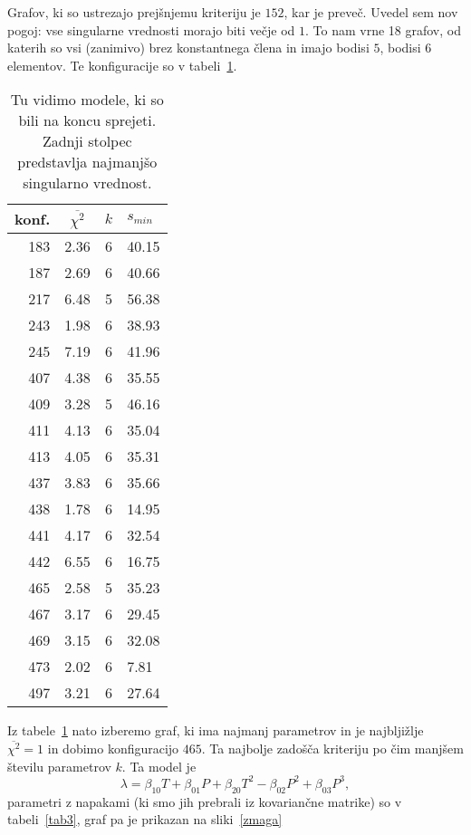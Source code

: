 \documentclass[a4 paper, 12pt]{article}
\begin{document}
Grafov, ki so ustrezajo prej\v snjemu kriteriju je $152$, kar je preve\v c. Uvedel sem nov pogoj: vse singularne
vrednosti morajo biti ve\v cje od $1$. To nam vrne 18 grafov, od katerih so vsi (zanimivo) brez konstantnega \v clena
in imajo bodisi $5$, bodisi $6$ elementov. Te konfiguracije so v tabeli~\ref{tab2}.
\begin{table}[H]\centering
	\caption{Tu vidimo modele, ki so bili na koncu sprejeti. Zadnji stolpec predstavlja najmanj\v so singularno
		vrednost.}
	\begin{tabular}{r|c|c|l}
		konf. & $\overline{\chi^2}$ & $k$ & $s_{min}$ \\
		\hline\hline
		183 & 2.36 & 6 & 40.15 \\
		187 & 2.69 & 6 & 40.66 \\
		217 & 6.48 & 5 & 56.38 \\
		243 & 1.98 & 6 & 38.93 \\
		245 & 7.19 & 6 & 41.96 \\
		407 & 4.38 & 6 & 35.55 \\
		409 & 3.28 & 5 & 46.16 \\
		411 & 4.13 & 6 & 35.04 \\
		413 & 4.05 & 6 & 35.31 \\
		437 & 3.83 & 6 & 35.66 \\
		438 & 1.78 & 6 & 14.95 \\
		441 & 4.17 & 6 & 32.54 \\
		442 & 6.55 & 6 & 16.75 \\
		465 & 2.58 & 5 & 35.23 \\
		467 & 3.17 & 6 & 29.45 \\
		469 & 3.15 & 6 & 32.08 \\
		473 & 2.02 & 6 & 7.81 \\
		497 & 3.21 & 6 & 27.64
	\end{tabular}
	\label{tab2}
\end{table}
Iz tabele~\ref{tab2} nato izberemo graf, ki ima najmanj parametrov in je najblji\v zlje $\overline{\chi^2} = 1$ in dobimo
konfiguracijo $465$. Ta najbolje zado\v s\v ca kriteriju po \v cim manj\v sem \v stevilu parametrov $k$. Ta model je
\begin{equation}
	\lambda = \beta_{10} T + \beta_{01} P + \beta_{20} T^2 - \beta_{02} P^2 + \beta_{03} P^3,
\end{equation}
parametri z napakami (ki smo jih prebrali iz kovarian\v cne matrike) so v tabeli~\ref{tab3}, graf pa je prikazan
na sliki~\ref{zmaga}
\end{document}
